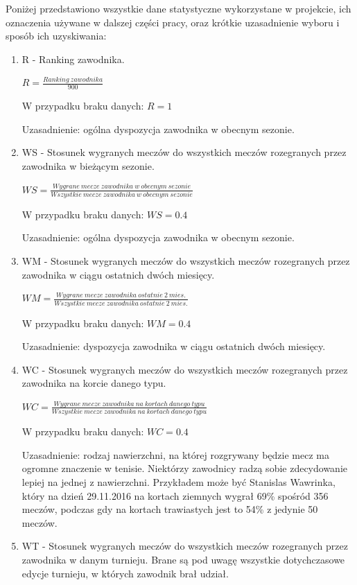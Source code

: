 Poniżej przedstawiono wszystkie dane statystyczne wykorzystane w projekcie, ich oznaczenia używane w dalszej części pracy, oraz krótkie uzasadnienie wyboru i sposób ich uzyskiwania:
\begin{enumerate}
\item R - Ranking zawodnika.

$R = \frac{Ranking\ zawodnika}{900}$

W przypadku braku danych: $R = 1$

Uzasadnienie: ogólna dyspozycja zawodnika w obecnym sezonie.

\item WS - Stosunek wygranych meczów do wszystkich meczów rozegranych przez zawodnika w bieżącym sezonie.

$WS = \frac{Wygrane\ mecze\ zawodnika\ w\ obecnym\ sezonie}{Wszystkie\ mecze\ zawodnika\ w\ obecnym\ sezonie}$

W przypadku braku danych: $WS = 0.4$

Uzasadnienie: ogólna dyspozycja zawodnika w obecnym sezonie.

\item WM - Stosunek wygranych meczów do wszystkich meczów rozegranych przez zawodnika w ciągu ostatnich dwóch miesięcy.

$WM = \frac{Wygrane\ mecze\ zawodnika\ ostatnie\ 2\ mies.}{Wszystkie\ mecze\ zawodnika\ ostatnie\ 2\ mies.}$

W przypadku braku danych: $WM = 0.4$

Uzasadnienie: dyspozycja zawodnika w ciągu ostatnich dwóch miesięcy.

\item WC - Stosunek wygranych meczów do wszystkich meczów rozegranych przez zawodnika na korcie danego typu.

$WC = \frac{Wygrane\ mecze\ zawodnika\ na\ kortach\ danego\ typu}{Wszystkie\ mecze\ zawodnika\ na\ kortach\ danego\ typu}$

W przypadku braku danych: $WC = 0.4$

Uzasadnienie: rodzaj nawierzchni, na której rozgrywany będzie mecz ma ogromne znaczenie w tenisie. Niektórzy zawodnicy radzą sobie zdecydowanie lepiej na jednej z nawierzchni. Przykładem może być Stanislas Wawrinka, który na dzień 29.11.2016 na kortach ziemnych wygrał 69\% spośród 356 meczów, podczas gdy na kortach trawiastych jest to 54\% z jedynie 50 meczów.

\item WT - Stosunek wygranych meczów do wszystkich meczów rozegranych przez zawodnika w danym turnieju. Brane są pod uwagę wszystkie dotychczasowe edycje turnieju, w których zawodnik brał udział.


\end{enumerate}
